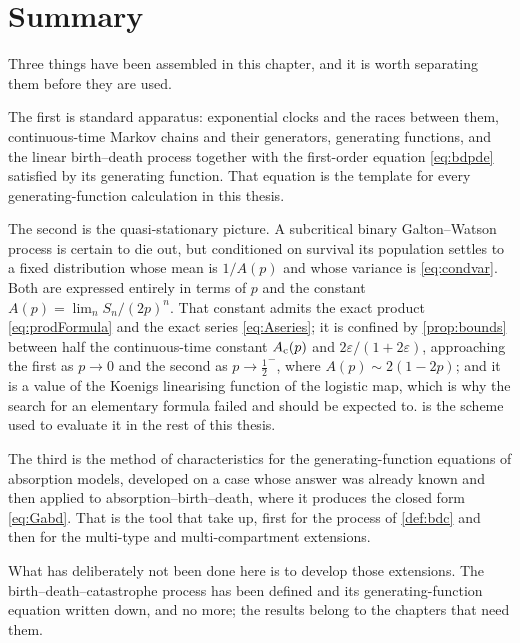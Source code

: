 \section{Summary}
\label{sec:summary}

Three things have been assembled in this chapter, and it is worth separating them
before they are used.

The first is standard apparatus: exponential clocks and the races between them,
continuous-time Markov chains and their generators, generating functions, and the
linear birth--death process together with the first-order equation
\cref{eq:bdpde} satisfied by its generating function. That equation is the template
for every generating-function calculation in this thesis.

The second is the quasi-stationary picture. A subcritical binary Galton--Watson
process is certain to die out, but conditioned on survival its population settles
to a fixed distribution whose mean is $1/A(p)$ and whose variance is
\cref{eq:condvar}. Both are expressed entirely in terms of $p$ and the constant
$A(p) = \lim_n S_n/(2p)^n$. That constant admits the exact product
\cref{eq:prodFormula} and the exact series \cref{eq:Aseries}; it is confined by
\cref{prop:bounds} between half the continuous-time constant $A_{\mathrm{c}}(p)$ and
$2\varepsilon/(1+2\varepsilon)$, approaching the first as $p\to0$ and the second as
$p\to\tfrac12^-$, where $A(p)\sim2(1-2p)$; and it is a value of the Koenigs
linearising function of the logistic map, which is why the search for an elementary
formula failed and should be expected to.  is the scheme used
to evaluate it in the rest of this thesis.

The third is the method of characteristics for the generating-function equations of
absorption models, developed on a case whose answer was already known and then
applied to absorption--birth--death, where it produces the closed form
\cref{eq:Gabd}. That is the tool that
 take up, first
for the process of \cref{def:bdc} and then for the multi-type and multi-compartment
extensions.

What has deliberately not been done here is to develop those extensions. The
birth--death--catastrophe process has been defined and its generating-function
equation written down, and no more; the results belong to the chapters that need
them.
